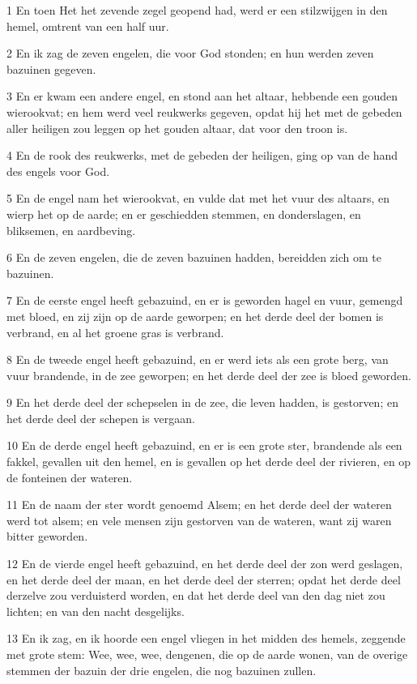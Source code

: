\par 1 En toen Het het zevende zegel geopend had, werd er een stilzwijgen in den hemel, omtrent van een half uur.
\par 2 En ik zag de zeven engelen, die voor God stonden; en hun werden zeven bazuinen gegeven.
\par 3 En er kwam een andere engel, en stond aan het altaar, hebbende een gouden wierookvat; en hem werd veel reukwerks gegeven, opdat hij het met de gebeden aller heiligen zou leggen op het gouden altaar, dat voor den troon is.
\par 4 En de rook des reukwerks, met de gebeden der heiligen, ging op van de hand des engels voor God.
\par 5 En de engel nam het wierookvat, en vulde dat met het vuur des altaars, en wierp het op de aarde; en er geschiedden stemmen, en donderslagen, en bliksemen, en aardbeving.
\par 6 En de zeven engelen, die de zeven bazuinen hadden, bereidden zich om te bazuinen.
\par 7 En de eerste engel heeft gebazuind, en er is geworden hagel en vuur, gemengd met bloed, en zij zijn op de aarde geworpen; en het derde deel der bomen is verbrand, en al het groene gras is verbrand.
\par 8 En de tweede engel heeft gebazuind, en er werd iets als een grote berg, van vuur brandende, in de zee geworpen; en het derde deel der zee is bloed geworden.
\par 9 En het derde deel der schepselen in de zee, die leven hadden, is gestorven; en het derde deel der schepen is vergaan.
\par 10 En de derde engel heeft gebazuind, en er is een grote ster, brandende als een fakkel, gevallen uit den hemel, en is gevallen op het derde deel der rivieren, en op de fonteinen der wateren.
\par 11 En de naam der ster wordt genoemd Alsem; en het derde deel der wateren werd tot alsem; en vele mensen zijn gestorven van de wateren, want zij waren bitter geworden.
\par 12 En de vierde engel heeft gebazuind, en het derde deel der zon werd geslagen, en het derde deel der maan, en het derde deel der sterren; opdat het derde deel derzelve zou verduisterd worden, en dat het derde deel van den dag niet zou lichten; en van den nacht desgelijks.
\par 13 En ik zag, en ik hoorde een engel vliegen in het midden des hemels, zeggende met grote stem: Wee, wee, wee, dengenen, die op de aarde wonen, van de overige stemmen der bazuin der drie engelen, die nog bazuinen zullen.


